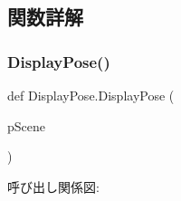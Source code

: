 \subsection{関数詳解}
\mbox{\label{namespace_display_pose_aa6ef9e7862b03171ee746def2ae1da08}} 
\subsubsection{\texorpdfstring{Display\+Pose()}{DisplayPose()}}
{\footnotesize\ttfamily def Display\+Pose.\+Display\+Pose (\begin{DoxyParamCaption}\item[{}]{p\+Scene }\end{DoxyParamCaption})}

呼び出し関係図\+:

